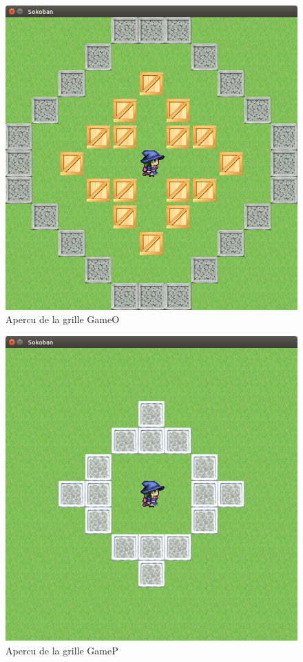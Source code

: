 \documentclass{article}
\begin{document}
\begin{figure}[!h]
\centering
\includegraphics[scale=0.25]{img/06.png}
\caption{Apercu de la grille GameO}
\end{figure}

\begin{figure}[!h]
\centering
\includegraphics[scale=0.25]{img/07.png}
\caption{Apercu de la grille GameP}
\end{figure}
\end{document}
